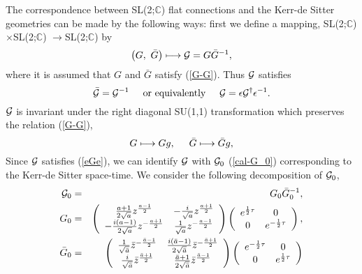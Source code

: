\documentclass[a4paper,11pt]{article}
\begin{document}
The correspondence between SL(2;$\mathbb{C}$) flat connections and 
the Kerr-de Sitter geometries can be made by the following ways:
first we define a mapping, 
SL(2;$\mathbb{C}$)$\times$SL(2;$\mathbb{C}$)
    $\longrightarrow$SL(2;$\mathbb{C}$)
by
\begin{equation}
\left(G, \ \bar{G}\right)  \longmapsto {\cal G}=G\bar{G}^{-1},
\end{equation}
where it is assumed that $G$ and $\bar{G}$ satisfy (\ref{G-G}).
Thus ${\cal G}$ satisfies 
\begin{equation}
\label{eGe}
\bar{{\cal G}}={\cal G}^{-1} 
 \hspace{5mm} \mbox{or equivalently} \hspace{5mm} 
   {\cal G}=\epsilon {\cal G}^\dagger\epsilon^{-1}.
\end{equation}
${\cal G}$ is invariant under the right diagonal SU(1,1) transformation 
which preserves the relation (\ref{G-G}), 
\begin{equation}
\label{pairing}
G \longmapsto Gg, \hspace{5mm} \bar{G} \longmapsto \bar{G}g, 
\end{equation}
Since ${\cal G}$ satisfies (\ref{eGe}), we can identify ${\cal G}$ with 
${\cal G}_0$ (\ref{cal-G_0}) corresponding to the Kerr-de Sitter space-time.
We consider the following decomposition of ${\cal G}_0$, 
\begin{eqnarray}
{\cal G}_0 &=& G_0\bar{G}_0^{-1}, \nonumber \\
G_0 &=& \left(\begin{array}{cc}
        \frac{a+1}{2\sqrt{a}}z^{\frac{a-1}{2}} & 
          -\frac{i}{\sqrt{a}}z^{\frac{a+1}{2}} \\
        -\frac{i(a-1)}{2\sqrt{a}}z^{-\frac{a+1}{2}} & 
          \frac{1}{\sqrt{a}}z^{-\frac{a-1}{2}}
       \end{array}\right)
      \left(\begin{array}{cc}
        e^{\frac{1}{2}\tau} &  0 \\
      0 & e^{-\frac{1}{2}\tau}
      \end{array}\right), \\
\bar{G}_0 &=&  \left(\begin{array}{cc}
     \frac{1}{\sqrt{\bar{a}}}\bar{z}^{-\frac{\bar{a}-1}{2}} & 
       \frac{i(\bar{a}-1)}{2\sqrt{\bar{a}}}\bar{z}^{-\frac{\bar{a}+1}{2}} \\
     \frac{i}{\sqrt{\bar{a}}}\bar{z}^{\frac{\bar{a}+1}{2}} & 
       \frac{\bar{a}+1}{2\sqrt{\bar{a}}}\bar{z}^{\frac{\bar{a}-1}{2}}
       \end{array}\right)
 \left(\begin{array}{cc}
  e^{-\frac{1}{2}\tau} &  0 \\
  0 & e^{\frac{1}{2}\tau}
	    \end{array}\right)
\end{eqnarray}
\end{document}
